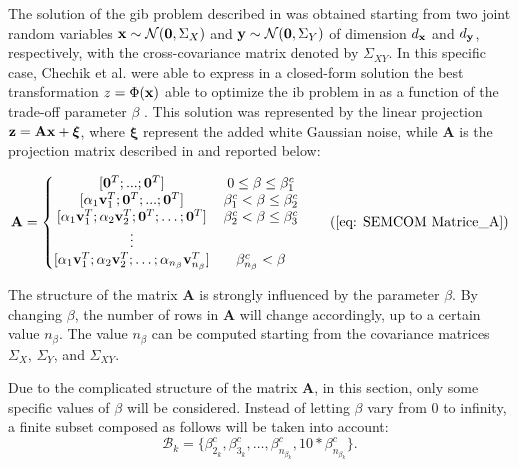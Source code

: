 The solution of the \gls{gib} problem described in  was obtained starting from two joint random variables $\mathbf{x}\sim \mathcal{N}(\mathbf{0}, \Sigma_{X})$ and $\mathbf{y}\sim \mathcal{N}(\mathbf{0}, \Sigma_{Y})$ of dimension $d_{\mathbf{x}}$ and $d_{\mathbf{y}}$, respectively, with the cross-covariance matrix denoted by $\Sigma_{XY}$. In this specific case, Chechik et al. were able to express in a closed-form solution the best transformation $z= \Phi(\mathbf{x})$ able to optimize the \gls{ib} problem in  as a function of the trade-off parameter $\beta$  \cite{Chechik2004GIB}. This solution was represented by the linear projection $\mathbf{z} = \mathbf{A} \mathbf{x} + \boldsymbol{\xi}$, where $\boldsymbol{\xi}$ represent the added white Gaussian noise, while $\mathbf{A}$ is the projection matrix described in  and reported below:

\begin{equation}
    \mathbf{A} = \left\{\begin{matrix}
                [\mathbf{0}^T;...;\mathbf{0}^T] & 0 \leq \beta \leq \beta_1^c\\
                [\alpha_1\mathbf{v}_1^T; \mathbf{0}^T;...;\mathbf{0}^T] & \beta_1^c < \beta \leq \beta_2^c\\
                [\alpha_1 \mathbf{v}_1^T;\alpha_2\mathbf{v}_2^T;\mathbf{0}^T;\ldots;\mathbf{0}^T] & \beta_2^c < \beta \leq \beta_3^c\\
                \vdots\\
                [\alpha_1 \mathbf{v}_1^T;\alpha_2\mathbf{v}_2^T;\ldots;\alpha_{n_{\beta}}\mathbf{v}_{n_{\beta}}^T] & \beta_{n_{\beta}}^c < \beta 
                \end{matrix}\right.
    \tag{\ref{eq: SEMCOM Matrice_A}}
    \label{eq: EN_ib Matrice_A}
\end{equation}

The structure of the matrix $\mathbf{A}$ is strongly influenced by the parameter $\beta$. By changing $\beta$, the number of rows in $\mathbf{A}$ will change accordingly, up to a certain value $n_{\beta}$. The value $n_{\beta}$ can be computed starting from the covariance matrices $\Sigma_{X}$, $\Sigma_{Y}$, and $\Sigma_{XY}$.

Due to the complicated structure of the matrix $\mathbf{A}$, in this section, only some specific values of  $\beta$ will be considered. Instead of letting $\beta$ vary from $0$ to infinity, a finite subset composed as follows will be taken into account: 
\begin{equation} 
    \mathcal{B}_k = \{ \beta_{2_k}^c, \beta_{3_k}^c, \ldots, \beta_{n_{\beta_k}}^c, 10*\beta_{n_{\beta_k}}^c\}. \label{eq: EN_ib beta_set} 
\end{equation} 


